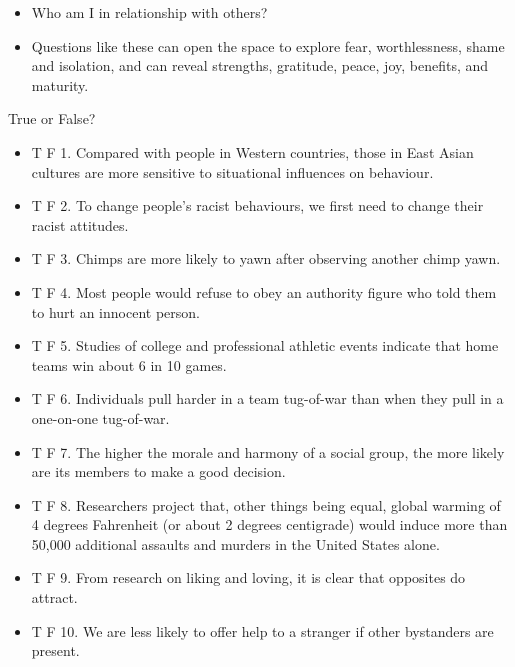 \documentclass[
]{book}
\providecommand{\tightlist}{%
  \setlength{\itemsep}{0pt}\setlength{\parskip}{0pt}}
\begin{document}
\begin{reflect}
\begin{itemize}
  \begin{itemize}
  \tightlist
  \item
    Who am I in relationship with others?
  \item
    Questions like these can open the space to explore fear, worthlessness, shame and isolation, and can reveal strengths, gratitude, peace, joy, benefits, and maturity.
  \end{itemize}
\end{itemize}

True or False?

\begin{itemize}
\tightlist
\item
  T F 1. Compared with people in Western countries, those in East Asian cultures are more sensitive to situational influences on behaviour.\\
\item
  T F 2. To change people's racist behaviours, we first need to change their racist attitudes.\\
\item
  T F 3. Chimps are more likely to yawn after observing another chimp yawn.\\
\item
  T F 4. Most people would refuse to obey an authority figure who told them to hurt an innocent person.\\
\item
  T F 5. Studies of college and professional athletic events indicate that home teams win about 6 in 10 games.\\
\item
  T F 6. Individuals pull harder in a team tug-of-war than when they pull in a one-on-one tug-of-war.\\
\item
  T F 7. The higher the morale and harmony of a social group, the more likely are its members to make a good decision.\\
\item
  T F 8. Researchers project that, other things being equal, global warming of 4 degrees Fahrenheit (or about 2 degrees centigrade) would induce more than 50,000 additional assaults and murders in the United States alone.\\
\item
  T F 9. From research on liking and loving, it is clear that opposites do attract.\\
\item
  T F 10. We are less likely to offer help to a stranger if other bystanders are present.
\end{itemize}


\end{reflect}
\end{document}
